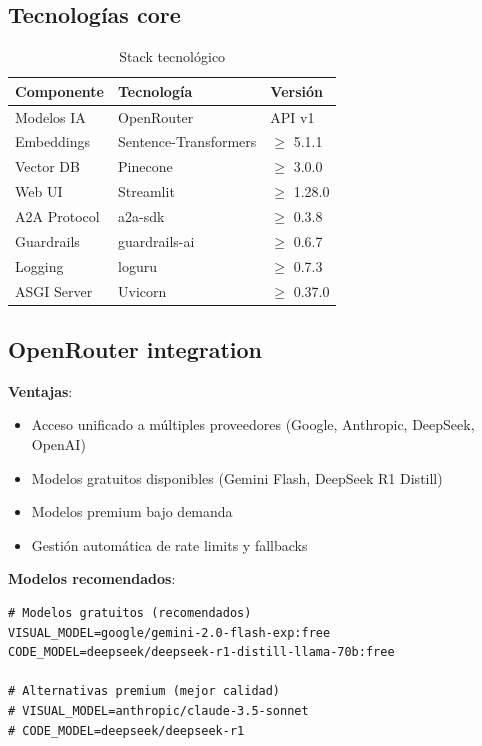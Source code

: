 \documentclass[12pt,a4paper]{article}
\begin{document}
\subsection{Tecnologías core}

\begin{table}[H]
\centering
\caption{Stack tecnológico}
\begin{tabular}{lll}
\toprule
\textbf{Componente} & \textbf{Tecnología} & \textbf{Versión} \\
\midrule
Modelos IA & OpenRouter & API v1 \\
Embeddings & Sentence-Transformers & $\geq$ 5.1.1 \\
Vector DB & Pinecone & $\geq$ 3.0.0 \\
Web UI & Streamlit & $\geq$ 1.28.0 \\
A2A Protocol & a2a-sdk & $\geq$ 0.3.8 \\
Guardrails & guardrails-ai & $\geq$ 0.6.7 \\
Logging & loguru & $\geq$ 0.7.3 \\
ASGI Server & Uvicorn & $\geq$ 0.37.0 \\
\bottomrule
\end{tabular}
\end{table}

\subsection{OpenRouter integration}

\textbf{Ventajas}:
\begin{itemize}
    \item Acceso unificado a múltiples proveedores (Google, Anthropic, DeepSeek, OpenAI)
    \item Modelos gratuitos disponibles (Gemini Flash, DeepSeek R1 Distill)
    \item Modelos premium bajo demanda
    \item Gestión automática de rate limits y fallbacks
\end{itemize}

\textbf{Modelos recomendados}:
\begin{lstlisting}[caption={Configuracion de Modelos en .env}]
# Modelos gratuitos (recomendados)
VISUAL_MODEL=google/gemini-2.0-flash-exp:free
CODE_MODEL=deepseek/deepseek-r1-distill-llama-70b:free

# Alternativas premium (mejor calidad)
# VISUAL_MODEL=anthropic/claude-3.5-sonnet
# CODE_MODEL=deepseek/deepseek-r1
\end{lstlisting}
\end{document}
